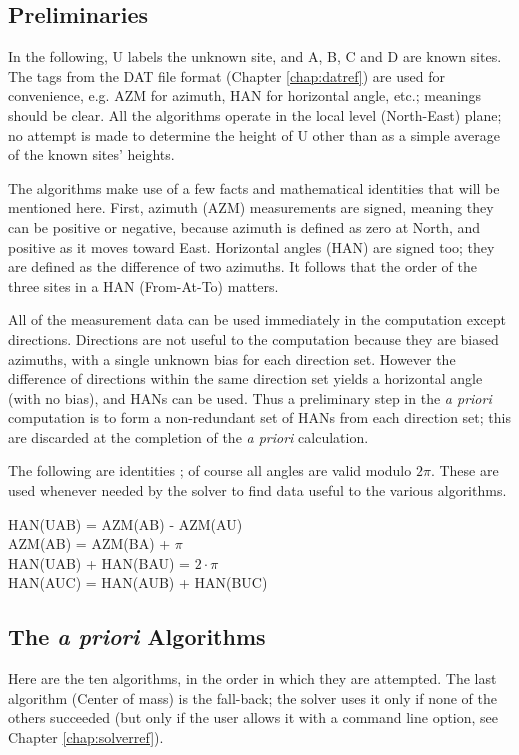 \subsection{Preliminaries}
In the following, U labels the unknown site, and A, B, C and D are known sites. The tags from the DAT file format (Chapter \ref{chap:datref}) are used for convenience, e.g. AZM for azimuth, HAN for horizontal angle, etc.; meanings should be clear. All the algorithms operate in the local level (North-East) plane; no attempt is made to determine the height of U other than as a simple average of the known sites' heights.

The algorithms make use of a few facts and mathematical identities that will be mentioned here. First, azimuth (AZM) measurements are signed, meaning they can be positive or negative, because azimuth is defined as zero at North, and positive as it moves toward East. Horizontal angles (HAN) are signed too; they are defined as the difference of two azimuths. It follows that the order of the three sites in a HAN (From-At-To) matters.

All of the measurement data can be used immediately in the computation except directions. Directions are not useful to the computation because they are biased azimuths, with a single unknown bias for each direction set. However the difference of directions within the same direction set yields a horizontal angle (with no bias), and HANs can be used. Thus a preliminary step in the \emph{a priori} computation is to form a non-redundant set of HANs from each direction set; this are discarded at the completion of the \emph{a priori} calculation.

The following are identities \cite{ghilani}; of course all angles are valid modulo $2\pi$. These are used whenever needed by the solver to find data useful to the various algorithms.

\hangindent=3cm
HAN(UAB) = AZM(AB) - AZM(AU) \\ AZM(AB) = AZM(BA) + $\pi$ \\ HAN(UAB) + HAN(BAU) = $2 \cdot \pi$ \\ HAN(AUC) = HAN(AUB) + HAN(BUC)

\subsection{The \emph{a priori} Algorithms}
\label{sec:apriorialgorithmsec}
Here are the ten algorithms, in the order in which they are attempted. The last algorithm (Center of mass) is the fall-back; the solver uses it only if none of the others succeeded (but only if the user allows it with a command line option, see Chapter \ref{chap:solverref}).

